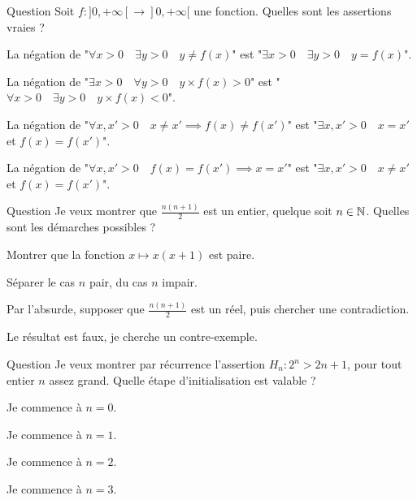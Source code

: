 \begin{multi}[multiple,feedback=
{La négation du "\(\forall x > 0 \quad \exists y > 0 \ldots\)" commence par "\(\exists x > 0 \quad \forall y > 0\).
La négation de "\(f(x) = f(x') \implies x = x'\)" est "\(f(x) = f(x')\) et \(x \neq x'\)".
}]{Question}
Soit \(f : ]0,+\infty[ \to ]0,+\infty[\) une fonction.
Quelles sont les assertions vraies ?

    \item La négation de "\(\forall x > 0 \quad \exists y > 0 \quad y \neq f(x)\)" est "\(\exists x > 0 \quad \exists y > 0 \quad y = f(x)\)".
    \item La négation de "\(\exists x > 0 \quad \forall y > 0 \quad y \times f(x)>0\)" est "\(\forall x > 0 \quad \exists y > 0 \quad y\times f(x) < 0\)".
    \item La négation de "\(\forall x,x' > 0 \quad x \neq x' \implies f(x) \neq f(x')\)" est "\(\exists x,x' > 0 \quad x = x'\) et \(f(x) = f(x')\)".
    \item* La négation de "\(\forall x,x' > 0 \quad f(x) = f(x') \implies x = x'\)" est "\(\exists x,x' > 0 \quad x \neq x'\) et \(f(x) = f(x')\)".
\end{multi}


\begin{multi}[multiple,feedback=
{Séparer le cas \(n\) pair, du cas \(n\) impair. Dans le premier cas, on peut écrire \(n=2k\) (avec \(k\in \Nn\)), dans le second cas \(n=2k+1\), puis calculer \(\frac{n(n+1)}{2}\). 
}]{Question}
Je veux montrer que \(\frac{n(n+1)}{2}\) est un entier, quelque soit \(n\in\mathbb{N}\).  Quelles sont les démarches possibles ?

    \item Montrer que la fonction \(x \mapsto x(x+1)\) est paire.
    \item* Séparer le cas \(n\) pair, du cas \(n\) impair.
    \item Par l'absurde, supposer que \(\frac{n(n+1)}{2}\) est un réel, puis chercher une contradiction.
    \item Le résultat est faux, je cherche un contre-exemple.
\end{multi}


\begin{multi}[multiple,feedback=
{L'initialisation peut commencer à n'importe quel entier \(n_0 \ge 3\).
}]{Question}
Je veux montrer par récurrence l'assertion \(H_n : 2^n > 2n+1\), pour tout entier \(n\) assez grand. Quelle étape d'initialisation est valable ?

    \item Je commence à \(n=0\).
    \item Je commence à \(n=1\).
    \item Je commence à \(n=2\).
    \item* Je commence à \(n=3\).
\end{multi}


